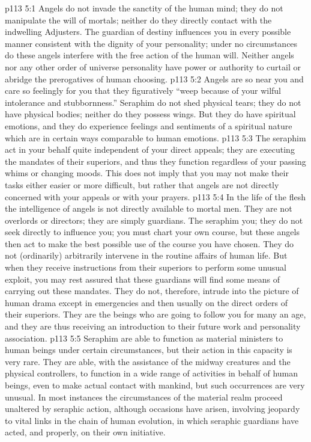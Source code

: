 \vs p113 5:1 Angels do not invade the sanctity of the human mind; they do not manipulate the will of mortals; neither do they directly contact with the indwelling Adjusters. The guardian of destiny influences you in every possible manner consistent with the dignity of your personality; under no circumstances do these angels interfere with the free action of the human will. Neither angels nor any other order of universe personality have power or authority to curtail or abridge the prerogatives of human choosing.
\vs p113 5:2 Angels are so near you and care so feelingly for you that they figuratively “weep because of your wilful intolerance and stubbornness.” Seraphim do not shed physical tears; they do not have physical bodies; neither do they possess wings. But they do have spiritual emotions, and they do experience feelings and sentiments of a spiritual nature which are in certain ways comparable to human emotions.
\vs p113 5:3 The seraphim act in your behalf quite independent of your direct appeals; they are executing the mandates of their superiors, and thus they function regardless of your passing whims or changing moods. This does not imply that you may not make their tasks either easier or more difficult, but rather that angels are not directly concerned with your appeals or with your prayers.
\vs p113 5:4 In the life of the flesh the intelligence of angels is not directly available to mortal men. They are not overlords or directors; they are simply guardians. The seraphim  you; they do not seek directly to influence you; you must chart your own course, but these angels then act to make the best possible use of the course you have chosen. They do not (ordinarily) arbitrarily intervene in the routine affairs of human life. But when they receive instructions from their superiors to perform some unusual exploit, you may rest assured that these guardians will find some means of carrying out these mandates. They do not, therefore, intrude into the picture of human drama except in emergencies and then usually on the direct orders of their superiors. They are the beings who are going to follow you for many an age, and they are thus receiving an introduction to their future work and personality association.
\vs p113 5:5 \pc Seraphim are able to function as material ministers to human beings under certain circumstances, but their action in this capacity is very rare. They are able, with the assistance of the midway creatures and the physical controllers, to function in a wide range of activities in behalf of human beings, even to make actual contact with mankind, but such occurrences are very unusual. In most instances the circumstances of the material realm proceed unaltered by seraphic action, although occasions have arisen, involving jeopardy to vital links in the chain of human evolution, in which seraphic guardians have acted, and properly, on their own initiative.
